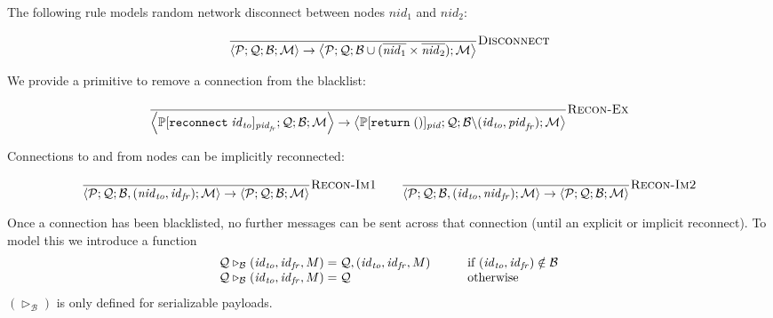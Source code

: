 \documentclass{article}
\newcommand{\sReturn}{\mathtt{return}}
\newcommand{\sReconnect}{\mathtt{reconnect}}
\newcommand{\sExtend}[1]{\mathrel{\triangleright_{#1}}}
\newcommand{\sNid}{\ensuremath{\mathit{nid}}}
\newcommand{\sPid}{\ensuremath{\mathit{pid}}}
\newcommand{\sId}{\ensuremath{\mathit{id}}}
\newcommand{\sSystem}[4]{\left\langle #1 ; #2 ; #3 ; #4 \right\rangle}
\newcommand{\sQueue}{\mathcal{Q}}
\newcommand{\sProcesses}{\mathcal{P}}
\newcommand{\sBlacklist}{\mathcal{B}}
\newcommand{\sMonitors}{\mathcal{M}}
\newcommand{\sCtxt}[1]{\mathbb{#1}}
\begin{document}
The following rule models random network disconnect between nodes $\sNid_1$ and
$\sNid_2$:

\begin{equation*}
\frac{
}{
  \sSystem{\sProcesses}{\sQueue}{\sBlacklist}{\sMonitors}
\rightarrow
  \sSystem{\sProcesses}{\sQueue}{\sBlacklist \cup (\overline{\sNid_1} \times \overline{\sNid_2})}{\sMonitors}
} \textsc{Disconnect}
\end{equation*}

We provide a primitive to remove a connection from the blacklist:

\begin{equation*}
\frac{
}{
  \sSystem{\sCtxt{P}[ \sReconnect \; \sId_\mathit{to} ]_{\sPid_\mathit{fr}}}
          {\sQueue}
          {\sBlacklist}
          {\sMonitors}
\rightarrow
  \sSystem{\sCtxt{P}[ \sReturn \; () ]_\sPid}
          {\sQueue}
          {\sBlacklist \backslash (\sId_\mathit{to}, \sPid_\mathit{fr})}
          {\sMonitors}
} \textsc{Recon-Ex}
\end{equation*}

Connections to and from nodes can be implicitly reconnected:

\begin{equation*}
\frac{
}{
  \sSystem{\sProcesses}{\sQueue}{\sBlacklist, (\sNid_\mathit{to}, \sId_\mathit{fr})}{\sMonitors}
\rightarrow
  \sSystem{\sProcesses}{\sQueue}{\sBlacklist}{\sMonitors}
} \textsc{Recon-Im1}
\qquad
\frac{
}{
  \sSystem{\sProcesses}{\sQueue}{\sBlacklist, (\sId_\mathit{to}, \sNid_\mathit{fr})}{\sMonitors}
\rightarrow
  \sSystem{\sProcesses}{\sQueue}{\sBlacklist}{\sMonitors}
} \textsc{Recon-Im2}
\end{equation*}

Once a connection has been blacklisted, no further messages can be sent across
that connection (until an explicit or implicit reconnect). To model this we
introduce a function
%
\begin{equation*}
\begin{array}{l@{\;=\;}l@{\hspace{3em}}l}
  \sQueue \sExtend{\sBlacklist} (\sId_\mathit{to}, \sId_\mathit{fr}, M) 
& 
  \sQueue,  (\sId_\mathit{to}, \sId_\mathit{fr}, M)
&
  \text{if } (\sId_\mathit{to}, \sId_\mathit{fr}) \notin \sBlacklist
\\
  \sQueue \sExtend{\sBlacklist} (\sId_\mathit{to}, \sId_\mathit{fr}, M) 
& 
  \sQueue
&
  \text{otherwise}
\end{array}
\end{equation*}
%
$(\sExtend{\sBlacklist})$ is only defined for serializable payloads.
\end{document}
